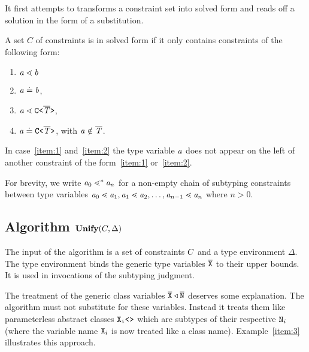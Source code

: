 \color{black}

It first attempts to transforms a constraint set into solved form and
reads off a solution in the form of a substitution.

\begin{definition}\label{def:solved-form}
  A set $C$ of constraints is in solved form if it only contains
  constraints of  the following form:
  \begin{enumerate}
  \item $\mathit{ a } \lessdot \mathit{ b }$ %
  \item $\mathit{ a } \doteq \mathit{ b }$,
  \item\label{item:1} $\mathit{ a } \lessdot \mathtt{C \texttt{<} \overline{\tt \mathit{T}} \texttt{>} }$, 
  \item\label{item:2} $\mathit{ a } \doteq \mathtt{C \texttt{<} \overline{\tt \mathit{T}} \texttt{>} }$, with $\mathit{ a } \notin \overline{\tt \mathit{T}}$.
  \end{enumerate}
  In case~\ref{item:1} and~\ref{item:2} the type variable $\mathit{ a }$ does not appear on the left of another constraint of the
  form~\ref{item:1} or~\ref{item:2}.
\end{definition}  

For brevity, we write $\mathit{ a }_0 \lessdot^* \mathit{ a }_n$ for a non-empty chain of subtyping constraints between type variables $\mathit{ a }_0 \lessdot
\mathit{ a }_1, \mathit{ a }_1 \lessdot \mathit{ a }_2, \dots, \mathit{ a }_{n-1} \lessdot \mathit{ a }_n$ where $n>0$.

\subsection{{Algorithm $\textbf{Unify}{} (C, \Delta)$}}


The input of the algorithm is a set of constraints $C$ and a
type environment $\Delta$. The type environment binds the generic type
variables $\overline{\tt X}$ to their upper bounds. It is used in invocations of
the subtyping judgment.

The treatment of the generic class variables $\overline{\tt X} \triangleleft \overline{\tt N}$
deserves some explanation. The algorithm must not substitute
for these variables. Instead it treats them like parameterless
abstract classes $\mathtt{X_i \texttt{<}  \texttt{>} }$ which are subtypes of their
respective ${\tt N}_i$ (where the variable name ${\tt X}_i$ is now
treated like a class name). Example~\ref{item:3} illustrates this
approach.  

